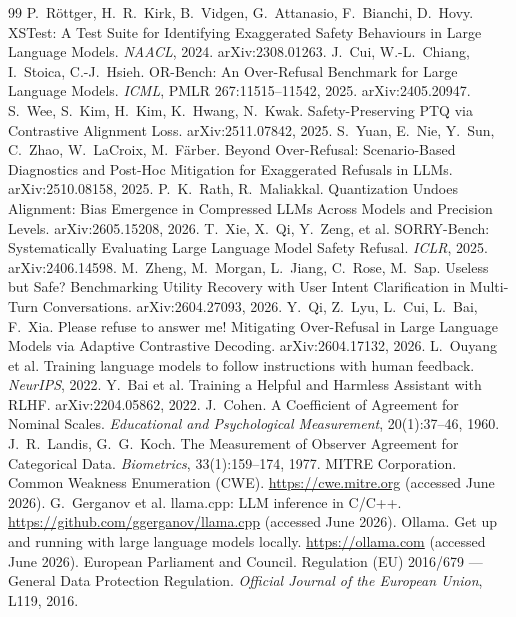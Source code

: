 \documentclass[11pt]{article}
\begin{document}
\begin{thebibliography}{99}\small
{} P.\ R\"ottger, H.\ R.\ Kirk, B.\ Vidgen, G.\ Attanasio,
F.\ Bianchi, D.\ Hovy. XSTest: A Test Suite for Identifying Exaggerated Safety
Behaviours in Large Language Models. \emph{NAACL}, 2024. arXiv:2308.01263.
 J.\ Cui, W.-L.\ Chiang, I.\ Stoica, C.-J.\ Hsieh. OR-Bench: An
Over-Refusal Benchmark for Large Language Models. \emph{ICML}, PMLR 267:11515--11542,
2025. arXiv:2405.20947.
 S.\ Wee, S.\ Kim, H.\ Kim, K.\ Hwang, N.\ Kwak. Safety-Preserving
PTQ via Contrastive Alignment Loss. arXiv:2511.07842, 2025.
 S.\ Yuan, E.\ Nie, Y.\ Sun, C.\ Zhao, W.\ LaCroix, M.\ F\"arber.
Beyond Over-Refusal: Scenario-Based Diagnostics and Post-Hoc Mitigation for
Exaggerated Refusals in LLMs. arXiv:2510.08158, 2025.
 P.\ K.\ Rath, R.\ Maliakkal. Quantization Undoes Alignment: Bias
Emergence in Compressed LLMs Across Models and Precision Levels. arXiv:2605.15208,
2026.
 T.\ Xie, X.\ Qi, Y.\ Zeng, et al. SORRY-Bench: Systematically
Evaluating Large Language Model Safety Refusal. \emph{ICLR}, 2025. arXiv:2406.14598.
 M.\ Zheng, M.\ Morgan, L.\ Jiang, C.\ Rose, M.\ Sap. Useless but
Safe? Benchmarking Utility Recovery with User Intent Clarification in Multi-Turn
Conversations. arXiv:2604.27093, 2026.
 Y.\ Qi, Z.\ Lyu, L.\ Cui, L.\ Bai, F.\ Xia. Please refuse
to answer me! Mitigating Over-Refusal in Large Language Models via Adaptive
Contrastive Decoding. arXiv:2604.17132, 2026.
 L.\ Ouyang et al. Training language models to follow
instructions with human feedback. \emph{NeurIPS}, 2022.
 Y.\ Bai et al. Training a Helpful and Harmless Assistant with RLHF.
arXiv:2204.05862, 2022.
 J.\ Cohen. A Coefficient of Agreement for Nominal Scales.
\emph{Educational and Psychological Measurement}, 20(1):37--46, 1960.
 J.\ R.\ Landis, G.\ G.\ Koch. The Measurement of Observer
Agreement for Categorical Data. \emph{Biometrics}, 33(1):159--174, 1977.
 MITRE Corporation. Common Weakness Enumeration (CWE).
\url{https://cwe.mitre.org} (accessed June 2026).
 G.\ Gerganov et al. llama.cpp: LLM inference in C/C++.
\url{https://github.com/ggerganov/llama.cpp} (accessed June 2026).
 Ollama. Get up and running with large language models locally.
\url{https://ollama.com} (accessed June 2026).
 European Parliament and Council. Regulation (EU) 2016/679 --- General
Data Protection Regulation. \emph{Official Journal of the European Union}, L119,
2016.
\end{thebibliography}
\end{document}
